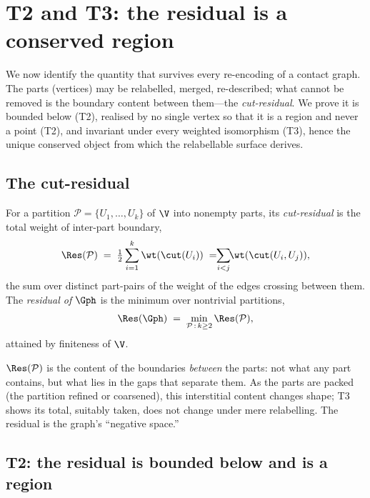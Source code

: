 
\section{T2 and T3: the residual is a conserved region}
\label{sec:residual}

We now identify the quantity that survives every re-encoding of a contact graph.
The parts (vertices) may be relabelled, merged, re-described; what cannot be
removed is the boundary content between them---the \emph{cut-residual}. We prove
it is bounded below (T2), realised by no single vertex so that it is a region and
never a point (T2), and invariant under every weighted isomorphism (T3), hence
the unique conserved object from which the relabellable surface derives.

\subsection{The cut-residual}

\begin{definition}
\label{def:residual}
For a partition $\mathcal{P}=\{U_1,\dots,U_k\}$ of $\V$ into nonempty parts, its
\emph{cut-residual} is the total weight of inter-part boundary,
\[
\Res(\mathcal{P})\;=\;\tfrac12\sum_{i=1}^{k}\wt(\cut(U_i))
\;=\!\!\sum_{\substack{i<j}}\!\!\wt(\cut(U_i,U_j)),
\]
the sum over distinct part-pairs of the weight of the edges crossing between
them. The \emph{residual of $\Gph$} is the minimum over nontrivial partitions,
\[
\Res(\Gph)\;=\;\min_{\mathcal{P}\,:\,k\ge 2}\Res(\mathcal{P}),
\]
attained by finiteness of $\V$.
\end{definition}

\begin{remark}
\label{rem:interstice}
$\Res(\mathcal{P})$ is the content of the boundaries \emph{between} the parts:
not what any part contains, but what lies in the gaps that separate them. As the
parts are packed (the partition refined or coarsened), this interstitial content
changes shape; T3 shows its total, suitably taken, does not change under mere
relabelling. The residual is the graph's ``negative space.''
\end{remark}

\subsection{T2: the residual is bounded below and is a region}

